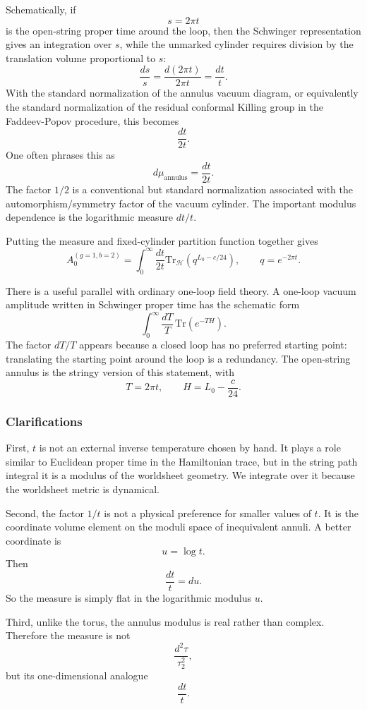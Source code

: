 \documentclass[
  10pt,
  a4paper,
  openany]{book}
\begin{document}
Schematically, if \[
s=2\pi t
\] is the open-string proper time around the loop, then the Schwinger
representation gives an integration over \(s\), while the unmarked
cylinder requires division by the translation volume proportional to
\(s\): \[
\frac{ds}{s}
=
\frac{d(2\pi t)}{2\pi t}
=
\frac{dt}{t}.
\] With the standard normalization of the annulus vacuum diagram, or
equivalently the standard normalization of the residual conformal
Killing group in the Faddeev-Popov procedure, this becomes \[
\frac{dt}{2t}.
\] One often phrases this as \[
d\mu_{\mathrm{annulus}}
=
\frac{dt}{2t}.
\] The factor \(1/2\) is a conventional but standard normalization
associated with the automorphism/symmetry factor of the vacuum cylinder.
The important modulus dependence is the logarithmic measure \(dt/t\).

Putting the measure and fixed-cylinder partition function together gives
\[
A_0^{(g=1,b=2)}
=
\int_0^\infty
\frac{dt}{2t}
\mathrm{Tr}_{\mathcal H}
\left(q^{L_0-c/24}\right),
\qquad
q=e^{-2\pi t}.
\]

There is a useful parallel with ordinary one-loop field theory. A
one-loop vacuum amplitude written in Schwinger proper time has the
schematic form \[
\int_0^\infty \frac{dT}{T}\,
\mathrm{Tr}\left(e^{-T H}\right).
\] The factor \(dT/T\) appears because a closed loop has no preferred
starting point: translating the starting point around the loop is a
redundancy. The open-string annulus is the stringy version of this
statement, with \[
T=2\pi t,
\qquad
H=L_0-\frac{c}{24}.
\]

\subsubsection{Clarifications}\label{clarifications-1}

First, \(t\) is not an external inverse temperature chosen by hand. It
plays a role similar to Euclidean proper time in the Hamiltonian trace,
but in the string path integral it is a modulus of the worldsheet
geometry. We integrate over it because the worldsheet metric is
dynamical.

Second, the factor \(1/t\) is not a physical preference for smaller
values of \(t\). It is the coordinate volume element on the moduli space
of inequivalent annuli. A better coordinate is \[
u=\log t.
\] Then \[
\frac{dt}{t}=du.
\] So the measure is simply flat in the logarithmic modulus \(u\).

Third, unlike the torus, the annulus modulus is real rather than
complex. Therefore the measure is not \[
\frac{d^2\tau}{\tau_2^2},
\] but its one-dimensional analogue \[
\frac{dt}{t}.
\]
\end{document}
